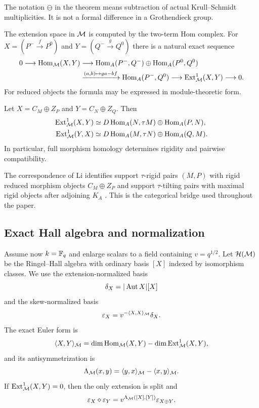 The notation $\ominus$ in the theorem means subtraction of actual
Krull--Schmidt multiplicities.  It is not a formal difference in a Grothendieck
group.

The extension space in $\mathcal M$ is computed by the two-term Hom complex.  For
$X=(P^-\xrightarrow fP^0)$ and $Y=(Q^-\xrightarrow gQ^0)$ there is a natural
exact sequence
\begin{equation}
\begin{aligned}
0\longrightarrow\operatorname{Hom}_{\mathcal M}(X,Y)
&\longrightarrow
 \operatorname{Hom}_A(P^-,Q^-)\oplus\operatorname{Hom}_A(P^0,Q^0)\\
&\xrightarrow{(a,b)\mapsto ga-bf}
 \operatorname{Hom}_A(P^-,Q^0)
 \longrightarrow\operatorname{Ext}^1_{\mathcal M}(X,Y)\longrightarrow0.
\end{aligned}
\label{eq:Hom-Ext-complex}
\end{equation}
For reduced objects the formula may be expressed in module-theoretic form.

\begin{proposition}
\label{prop:reduced-Ext}
Let $X=C_M\oplus Z_P$ and $Y=C_N\oplus Z_Q$.  Then
\begin{align}
 \operatorname{Ext}^1_{\mathcal M}(X,Y)
 &\simeq D\operatorname{Hom}_A(N,\tau M)\oplus\operatorname{Hom}_A(P,N),
 \label{eq:Ext-XY}\\
 \operatorname{Ext}^1_{\mathcal M}(Y,X)
 &\simeq D\operatorname{Hom}_A(M,\tau N)\oplus\operatorname{Hom}_A(Q,M).
 \label{eq:Ext-YX}
\end{align}
In particular, full morphism homology determines rigidity and pairwise
compatibility.
\end{proposition}

The correspondence of Li identifies support $\tau$-rigid pairs $(M,P)$ with
rigid reduced morphism objects $C_M\oplus Z_P$ and support $\tau$-tilting pairs
with maximal rigid objects after adjoining $K_A$ \cite{Li}.  This is the
categorical bridge used throughout the paper.

\subsection{Exact Hall algebra and normalization}

Assume now $k=\mathbb F_q$ and enlarge scalars to a field containing
$v=q^{1/2}$.  Let $\mathcal H(\mathcal M)$ be the Ringel--Hall algebra with ordinary basis
$[X]$ indexed by isomorphism classes.  We use the extension-normalized basis
\[
 \delta_X=|\operatorname{Aut} X|[X]
\]
and the skew-normalized basis
\begin{equation}
 \varepsilon_X=v^{-\langle X,X\rangle_{\mathcal M}}\delta_X.
 \label{eq:skew-normalized-basis}
\end{equation}
The exact Euler form is
\[
 \langle X,Y\rangle_{\mathcal M}
 =\dim\operatorname{Hom}_{\mathcal M}(X,Y)-\dim\operatorname{Ext}^1_{\mathcal M}(X,Y),
\]
and its antisymmetrization is
\[
 \Lambda_{\mathcal M}(x,y)
 =\langle y,x\rangle_{\mathcal M}-\langle x,y\rangle_{\mathcal M}.
\]
If $\operatorname{Ext}^1_{\mathcal M}(X,Y)=0$, then the only extension is split and
\begin{equation}
 \varepsilon_X\diamond\varepsilon_Y
 =v^{\Lambda_{\mathcal M}([X],[Y])}\varepsilon_{X\oplus Y}.
 \label{eq:split-Hall-product}
\end{equation}

